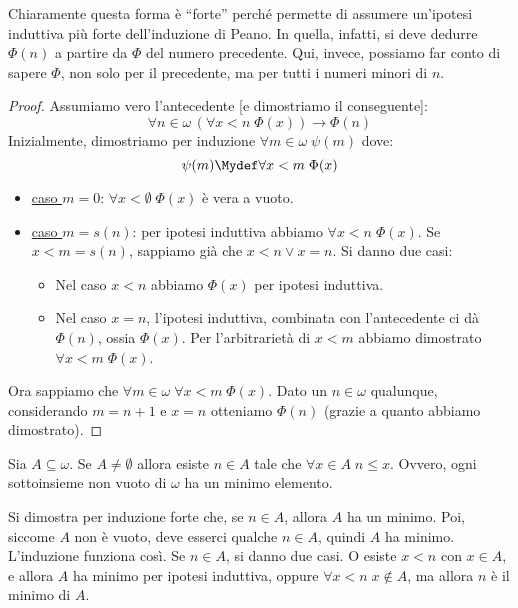 \documentclass[11pt]{scrartcl}
\begin{document}
\begin{remark}
	Chiaramente questa forma è ``forte'' perché permette di assumere un'ipotesi induttiva più forte dell'induzione di Peano. In quella, infatti, si deve dedurre $\Phi(n)$ a 
	partire da $\Phi$ del numero precedente. Qui, invece, possiamo far conto di sapere $\Phi$, non solo per il precedente, ma per tutti i numeri minori di $n$.
\end{remark}

\begin{proof}
	Assumiamo vero l'antecedente [e dimostriamo il conseguente]:
	\[ \forall n \in \omega \, (\forall x < n \; \Phi(x)) \rightarrow \Phi(n)
		\]
	Inizialmente, dimostriamo per induzione $\forall m \in \omega \; \psi(m)$ dove:
	\[ \psi(m) \Mydef \forall x < m \; \Phi(x)
		\]
	\begin{itemize}
		\item \underline{caso $m = 0$}: $\forall x < \emptyset \; \Phi(x)$ è vera a vuoto.
		\item \underline{caso $m = s(n)$}: per ipotesi induttiva abbiamo $\forall x < n \; \Phi(x).$ Se $x < m = s(n)$, sappiamo già che $x < n \lor x = n$. Si danno due casi:
		\begin{itemize}
			\item Nel caso $x < n$ abbiamo $\Phi(x)$ per ipotesi induttiva.
			\item Nel caso $x = n$, l'ipotesi induttiva, combinata con l'antecedente ci dà $\Phi(n)$, ossia $\Phi(x)$. Per l'arbitrarietà di $x<m$ abbiamo dimostrato $\forall x < m \; \Phi(x)$.
		\end{itemize}
	\end{itemize}
	Ora sappiamo che $\forall m \in \omega \; \forall x < m \; \Phi(x)$. Dato un $n \in \omega$ qualunque, considerando $m = n + 1$ e $x = n$ otteniamo $\Phi(n)$ (grazie a quanto abbiamo dimostrato).
\end{proof}

\begin{theorem}
	Sia $A \subseteq \omega$. Se $A \ne \emptyset$ allora esiste $n \in A$ tale che $\forall x \in A \; n \leq x$. Ovvero, ogni sottoinsieme non vuoto di $\omega$ ha un minimo elemento.
\end{theorem}

\begin{remark}
	 Si dimostra per induzione forte che, se $n \in A$, allora $A$ ha un minimo. Poi, siccome $A$ non è vuoto, deve esserci qualche $n \in A$, quindi $A$ ha minimo. L'induzione 
	funziona così. Se $n \in A$, si danno due casi. O esiste $x < n$ con $x \in A$, e allora $A$ ha minimo per ipotesi induttiva, oppure $\forall x < n \; x \not\in A$, ma allora $n$ è il minimo di $A$.
\end{remark}
\end{document}
